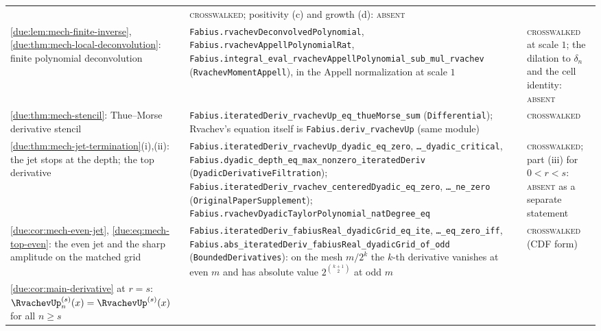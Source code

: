 \documentclass[11pt,oneside]{article}
\theoremstyle{plain}
\theoremstyle{definition}
\theoremstyle{remark}
\newcommand{\upn}[1]{\RvachevUp_{#1}}
\begin{document}
\begin{center}
\begin{longtable}{@{}>{\raggedright\arraybackslash}p{}>{\raggedright\arraybackslash}p{}>{\raggedright\arraybackslash}p{}@{}}
& \textsc{crosswalked}; positivity (c) and growth (d): \textsc{absent}\\[0.3em]
\cref{due:lem:mech-finite-inverse}, \cref{due:thm:mech-local-deconvolution}: finite polynomial deconvolution
& \texttt{Fabius.\allowbreak rvachevDeconvolvedPolynomial}, \texttt{Fabius.\allowbreak rvachevAppellPolynomialRat}, \texttt{Fabius.\allowbreak integral\_\allowbreak eval\_\allowbreak rvachevAppellPolynomial\_\allowbreak sub\_\allowbreak mul\_\allowbreak rvachev} (\texttt{RvachevMomentAppell}), in the Appell normalization at scale $1$
& \textsc{crosswalked} at scale $1$; the dilation to $\delta_{n}$ and the cell identity: \textsc{absent}\\[0.3em]
\cref{due:thm:mech-stencil}: Thue--Morse derivative stencil
& \texttt{Fabius.\allowbreak iteratedDeriv\_\allowbreak rvachevUp\_\allowbreak eq\_\allowbreak thueMorse\_\allowbreak sum} (\texttt{Differential}); Rvachev's equation itself is \texttt{Fabius.deriv\_rvachevUp} (same module)
& \textsc{crosswalked}\\[0.3em]
\cref{due:thm:mech-jet-termination}(i),(ii): the jet stops at the depth; the top derivative
& \texttt{Fabius.\allowbreak iteratedDeriv\_\allowbreak rvachevUp\_\allowbreak dyadic\_\allowbreak eq\_\allowbreak zero}, \texttt{\ldots\_dyadic\_critical}, \texttt{Fabius.\allowbreak dyadic\_\allowbreak depth\_\allowbreak eq\_\allowbreak max\_\allowbreak nonzero\_\allowbreak iteratedDeriv} (\texttt{DyadicDerivativeFiltration}); \texttt{Fabius.\allowbreak iteratedDeriv\_\allowbreak rvachev\_\allowbreak centeredDyadic\_\allowbreak eq\_\allowbreak zero}, \texttt{\ldots\_ne\_zero} (\texttt{OriginalPaperSupplement}); \texttt{Fabius.\allowbreak rvachevDyadicTaylorPolynomial\_\allowbreak natDegree\_\allowbreak eq}
& \textsc{crosswalked}; part (iii) for $0<r<s$: \textsc{absent} as a separate statement\\[0.3em]
\cref{due:cor:mech-even-jet}, \cref{due:eq:mech-top-even}: the even jet and the sharp amplitude on the matched grid
& \texttt{Fabius.\allowbreak iteratedDeriv\_\allowbreak fabiusReal\_\allowbreak dyadicGrid\_\allowbreak eq\_\allowbreak ite}, \texttt{\ldots\_eq\_zero\_iff}, \texttt{Fabius.\allowbreak abs\_\allowbreak iteratedDeriv\_\allowbreak fabiusReal\_\allowbreak dyadicGrid\_\allowbreak of\_\allowbreak odd} (\texttt{BoundedDerivatives}): on the mesh $m/2^{k}$ the $k$-th derivative vanishes at even $m$ and has absolute value $2^{\binom{k+1}{2}}$ at odd $m$
& \textsc{crosswalked} (CDF form)\\[0.3em]
\cref{due:cor:main-derivative} at $r=s$: $\upn{n}^{(s)}(x)=\RvachevUp^{(s)}(x)$ for all $n\ge s$

\end{longtable}
\end{center}
\end{document}

